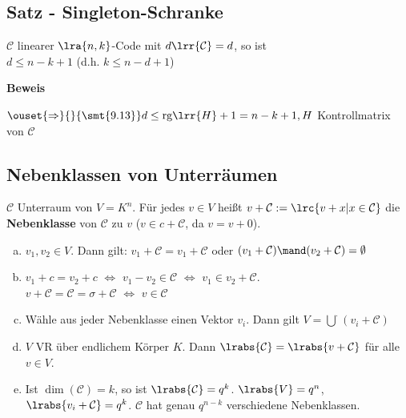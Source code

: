 	\subsection{Satz - Singleton-Schranke}
		$\mathcal{C}$ linearer $\lra{n,k}$-Code mit $d\lrr{\mathcal{C}}=d$, so ist\\
		$d\leq n-k+1$ (d.h. $k\leq n-d+1$)

		\textbf{Beweis}

		$\ouset{\Rightarrow}{}{\smt{9.13}} d\leq\mbox{rg}\lrr{H}+1=n-k+1, H$ Kontrollmatrix von $\mathcal{C}$
	
	\subsection{Nebenklassen von Unterräumen}
		$ \mathcal{C} $ Unterraum von $ V=K^n $. Für jedes $ v\in V $ heißt $ v+\mathcal{C}:=\lrc{v+x|x\in \mathcal{C}} $ die \textbf{Nebenklasse} von $\mathcal{C}$ zu $ v $ ($ v\in c+ \mathcal{C} $, da $ v=v+0 $).
		\begin{enumerate}[a)]
			\item $ v_1,v_2\in V $. Dann gilt: $ v_1+ \mathcal{C}=v_1+\mathcal{C} $ oder $ (v_1+\mathcal{C})\mand(v_2+\mathcal{C})=\emptyset $
			\item $ v_1+c=v_2+c $ $ \Leftrightarrow $ $ v_1-v_2\in \mathcal{C} $ $ \Leftrightarrow $ $ v_1\in v_2+ \mathcal{C} $.\\
			$ v+\mathcal{C}=\mathcal{C}=\sigma+\mathcal{C} $ $ \Leftrightarrow $ $ v\in \mathcal{C} $
			\item Wähle aus jeder Nebenklasse einen Vektor $ v_i $. Dann gilt $ V=\overset{\cdot}{\bigcup}(v_i+\mathcal{C}) $
			\item  $ V $ VR über endlichem Körper $ K $. Dann $ \lrabs{\mathcal{C}}=\lrabs{v+\mathcal{C}} $ für alle $ v\in V $.
			\item Ist $ \dim(\mathcal{C})=k $, so ist $ \lrabs{\mathcal{C}}=q^k $. $ \lrabs{V}=q^n $, $ \lrabs{v_i+\mathcal{C}}=q^k $. $ \mathcal{C} $ hat genau $ q^{n-k} $ verschiedene Nebenklassen.
		\end{enumerate}

